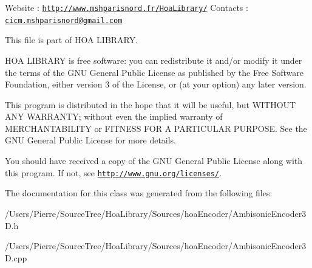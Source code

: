 Website \-: \href{http://www.mshparisnord.fr/HoaLibrary/}{\tt http\-://www.\-mshparisnord.\-fr/\-Hoa\-Library/} Contacts \-: \href{mailto:cicm.mshparisnord@gmail.com}{\tt cicm.\-mshparisnord@gmail.\-com}

This file is part of H\-O\-A L\-I\-B\-R\-A\-R\-Y.

H\-O\-A L\-I\-B\-R\-A\-R\-Y is free software\-: you can redistribute it and/or modify it under the terms of the G\-N\-U General Public License as published by the Free Software Foundation, either version 3 of the License, or (at your option) any later version.

This program is distributed in the hope that it will be useful, but W\-I\-T\-H\-O\-U\-T A\-N\-Y W\-A\-R\-R\-A\-N\-T\-Y; without even the implied warranty of M\-E\-R\-C\-H\-A\-N\-T\-A\-B\-I\-L\-I\-T\-Y or F\-I\-T\-N\-E\-S\-S F\-O\-R A P\-A\-R\-T\-I\-C\-U\-L\-A\-R P\-U\-R\-P\-O\-S\-E. See the G\-N\-U General Public License for more details.

You should have received a copy of the G\-N\-U General Public License along with this program. If not, see \href{http://www.gnu.org/licenses/}{\tt http\-://www.\-gnu.\-org/licenses/}. 

The documentation for this class was generated from the following files\-:\begin{DoxyCompactItemize}
\item 
/\-Users/\-Pierre/\-Source\-Tree/\-Hoa\-Library/\-Sources/hoa\-Encoder/Ambisonic\-Encoder3\-D.\-h\item 
/\-Users/\-Pierre/\-Source\-Tree/\-Hoa\-Library/\-Sources/hoa\-Encoder/Ambisonic\-Encoder3\-D.\-cpp\end{DoxyCompactItemize}
